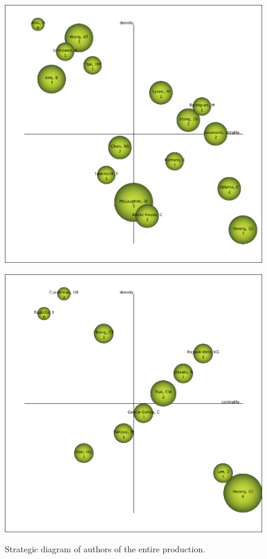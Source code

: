 \documentclass{textolivre}
\begin{document}
\begin{figure}[htbp]
 \begin{minipage}{.45\textwidth}
 \includegraphics[width=\textwidth]{Fig06a.png}
 \label{fig06a}
 \end{minipage}
 \hfill
 \begin{minipage}{.45\textwidth}
 \includegraphics[width=\textwidth]{Fig06b.png}
 \label{fig06b}
 \end{minipage}
 \caption{Strategic diagram of authors of the entire production.}
 \label{fig06}
\end{figure}
\end{document}
